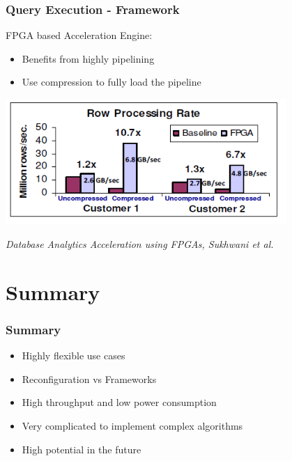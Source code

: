 \documentclass{beamer}
\begin{document}
\begin{frame}
	\frametitle{Query Execution - Framework}
	FPGA based Acceleration Engine:
	\begin{itemize}
		\item Benefits from highly pipelining
		\item Use compression to fully load the pipeline
	\end{itemize}
	
	\begin{center}
		\includegraphics[width=0.8\textwidth]{img/engine_eval.png}
	\end{center}

	\begin{center}
		\small \emph{Database Analytics Acceleration using FPGAs, Sukhwani et al.}
	\end{center}
\end{frame}

\section{Summary}
\begin{frame}
	\frametitle{Summary}
	\begin{itemize}
		\item Highly flexible use cases
		\item Reconfiguration vs Frameworks
		\item High throughput and low power consumption
		\item Very complicated to implement complex algorithms
		\item High potential in the future
	\end{itemize}
\end{frame}
\end{document}
